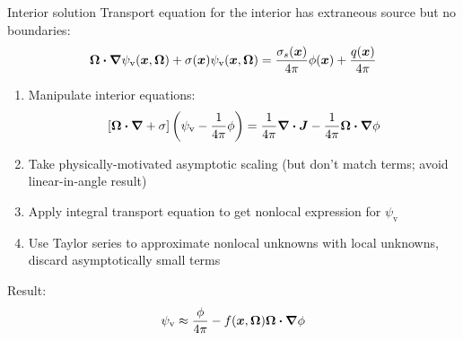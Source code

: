 \documentclass{beamer}
\newcommand{\psiv}{\psi_\mathrm{v}}
\begin{document}

\begin{frame}{Interior solution}
Transport equation for the interior has extraneous source but no boundaries:
\begin{equation} \label{eq:tdVol}
  \vec{\Omega}\vd \grad \psiv(\vec{x},\vec{\Omega})
  + \sigma(\vec{x}) \psiv(\vec{x},\vec{\Omega})
  = \frac{\sigma_s(\vec{x})}{4\pi}
  \phi(\vec{x}) + \frac{q(\vec{x})}{4\pi}
\end{equation}
  \begin{enumerate}
    \item Manipulate interior equations:
    \begin{equation}\label{eq:capPsiVol}
      \left[\vec{\Omega}\vd \grad + \sigma \right]
      \left( \psiv - \frac{1}{4\pi} \phi \right)
      = \frac{1}{4\pi} \grad \vd\vec{J} -
      \frac{1}{4\pi} \vec{\Omega}\vd \grad \phi
    \end{equation}
    \item Take physically-motivated asymptotic scaling (but don't match terms;
      avoid linear-in-angle result)
    \item Apply integral transport equation to get nonlocal expression for
      $\psiv$
    \item Use Taylor series to approximate nonlocal unknowns with
      local unknowns, discard asymptotically small terms
  \end{enumerate}
  Result:
  \begin{equation*}
    \psiv \approx \frac{\phi}{4\pi} - f(\vec{x},\vec{\Omega}) \vec{\Omega}\vd
    \grad \phi
  \end{equation*}
\end{frame}
\end{document}
